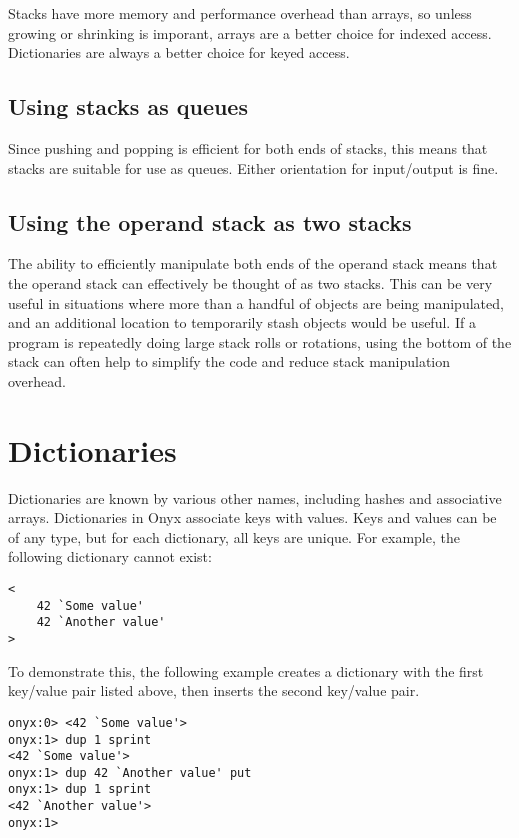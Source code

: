 Stacks have more memory and performance overhead than arrays, so unless growing
or shrinking is imporant, arrays are a better choice for indexed access.
Dictionaries are always a better choice for keyed access.

\subsection{Using stacks as queues}

Since pushing and popping is efficient for both ends of stacks, this means that
stacks are suitable for use as queues.  Either orientation for input/output is
fine.

\subsection{Using the operand stack as two stacks}

The ability to efficiently manipulate both ends of the operand stack means that
the operand stack can effectively be thought of as two stacks.  This can be very
useful in situations where more than a handful of objects are being manipulated,
and an additional location to temporarily stash objects would be useful.  If a
program is repeatedly doing large stack rolls or rotations, using the bottom of
the stack can often help to simplify the code and reduce stack manipulation
overhead.

\section{Dictionaries}

Dictionaries are known by various other names, including hashes and associative
arrays.  Dictionaries in Onyx associate keys with values.  Keys and values can
be of any type, but for each dictionary, all keys are unique.  For example, the
following dictionary cannot exist:

\begin{verbatim}
<
    42 `Some value'
    42 `Another value'
>
\end{verbatim}

To demonstrate this, the following example creates a dictionary with the first
key/value pair listed above, then inserts the second key/value pair.

\begin{verbatim}
onyx:0> <42 `Some value'>
onyx:1> dup 1 sprint
<42 `Some value'>
onyx:1> dup 42 `Another value' put
onyx:1> dup 1 sprint
<42 `Another value'>
onyx:1>
\end{verbatim}

